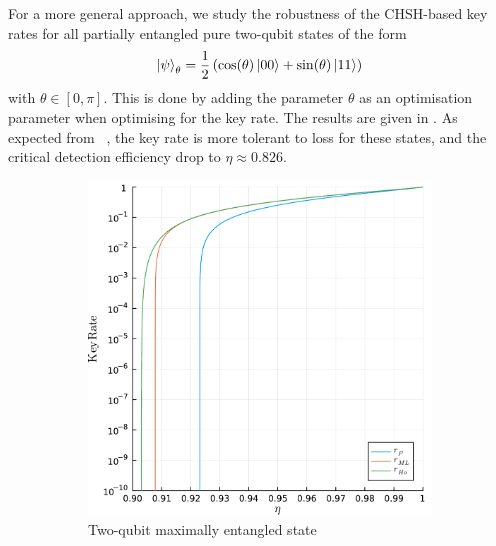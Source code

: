 For a more general approach, we study the robustness of the CHSH-based key rates for all partially entangled pure two-qubit states of the form
\begin{equation}
	\ket{\psi}_\theta = \frac{1}{2}\left(\cos(\theta)\ket{00}+\sin(\theta)\ket{11}\right)
	\label{eq:partiallyentangled}
\end{equation}
with $\theta\in[0,\pi]$.
This is done by adding the parameter $\theta$ as an optimisation parameter when optimising for the key rate.
The results are given in .
As expected from ~\cite{Eberhard1993}, the key rate is more tolerant to loss for these states, and the critical detection efficiency drop to $\eta\approx 0.826$.

\begin{figure}
     \centering
     \begin{subfigure}[b]{0.72\textwidth}
         \centering
         \includegraphics[width=\textwidth]{chapters/deviceindependent/img/key_rate_singlet.pdf}
         \caption{Two-qubit maximally entangled state}
         \label{fig:kr_singlet}
     \end{subfigure}
     \begin{subfigure}[b]{0.72\textwidth}
         \centering

\end{subfigure}
\end{figure}
